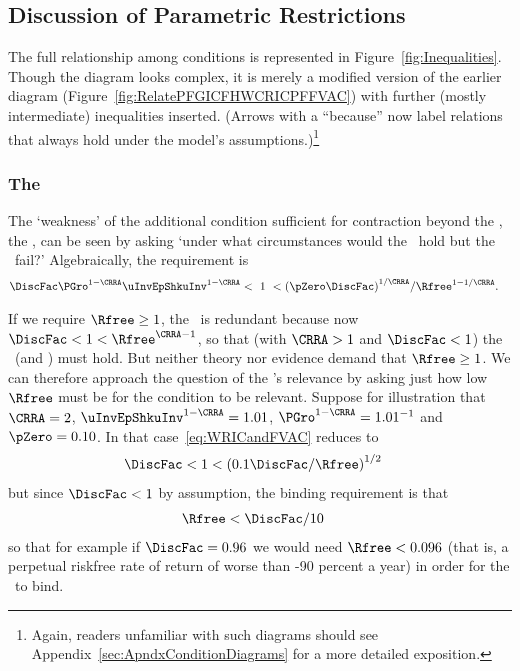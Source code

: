 \documentclass[ProjectDLO]{subfiles}
\begin{document}
\hypertarget{Discussion-of-Parametric-Restrictions}{}
\subsection{Discussion of Parametric Restrictions}\label{sec:discussConvergence}

The full relationship among conditions is represented in Figure~\ref{fig:Inequalities}.  Though the diagram looks complex, it is merely a modified version of the earlier diagram (Figure~\ref{fig:RelatePFGICFHWCRICPFFVAC}) with further (mostly intermediate) inequalities inserted.  (Arrows with a ``because'' now label relations that always hold under the model's assumptions.)\footnote{Again, readers unfamiliar with such diagrams should see Appendix~\ref{sec:ApndxConditionDiagrams} for a more detailed exposition.}

\renewcommand{\figName}{Inequalities} %
\renewcommand{\figFile}{\figName} %
\hypertarget{\figFile}{}

\subsubsection{The \WRIC}\label{subsubsec:WRICdiscuss}

The `weakness' of the additional condition sufficient for contraction beyond the {\FVAC}, the
\WRIC, can be seen by asking `under what circumstances
would the \FVAC~hold but the \WRIC~fail?'
Algebraically, the requirement is
\begin{align}
  \DiscFac \PGro^{1-\CRRA}\uInvEpShkuInv^{1-\CRRA} & < ~ 1 ~ <  {(\pZero \DiscFac)}^{1/\CRRA}/\Rfree^{1-1/\CRRA}. \label{eq:WRICandFVAC}
\end{align}

If we require $\Rfree \geq 1$, the {\WRIC}~is redundant because now $\DiscFac <1<\Rfree^{\CRRA-1}$, so that (with $\CRRA > 1$ and $\DiscFac<1$) the \RIC~(and \WRIC) must hold.  But neither theory nor evidence demand that $\Rfree \geq
1$.  We can therefore approach the question of the \WRIC's relevance by asking just how low $\Rfree$ must be for the condition to be relevant.
Suppose for illustration that $\CRRA=2$, $\uInvEpShkuInv^{1-\CRRA}=1.01$,
$\PGro^{1-\CRRA}=1.01^{-1}$ and $\pZero = 0.10$.  In that case~\eqref{eq:WRICandFVAC} reduces to
\begin{align*}
  \DiscFac  & < 1 < {(0.1 \DiscFac/\Rfree)}^{1/2}
\end{align*}
but since $\DiscFac < 1$ by assumption, the binding requirement is that
\begin{align*}
  \Rfree  & < \DiscFac/10 \notag
\end{align*}
so that for example if $\DiscFac=0.96$ we would need $\Rfree < 0.096$
(that is, a perpetual riskfree rate of return of worse than -90
percent a year) in order for the \WRIC~to bind. %
\end{document}
